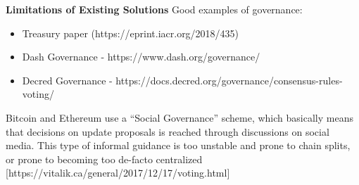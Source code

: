 \noindent\textbf{Limitations of Existing Solutions}
Good examples of governance:
\begin{itemize}
\item Treasury paper (https://eprint.iacr.org/2018/435)
\item Dash Governance  - https://www.dash.org/governance/ 
\item Decred Governance - https://docs.decred.org/governance/consensus-rules-voting/
\end{itemize}

Bitcoin and Ethereum use a \enquote{Social Governance} scheme, which basically means that decisions on update proposals is reached through discussions on social media. This type of informal guidance is  too unstable and prone to chain splits, or prone to becoming too de-facto centralized [https://vitalik.ca/general/2017/12/17/voting.html]
